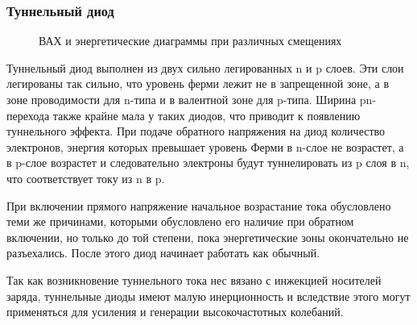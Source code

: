 \subsubsection{Туннельный диод}

\begin{center}
	\begin{figure}[h!]
		\caption{ВАХ и энергетические диаграммы при различных смещениях}	
		\label{pic:TunnelDiod}
	\end{figure}
\end{center}

Туннельный диод выполнен из двух сильно легированных n и p слоев. Эти слои легированы так сильно, что уровень ферми лежит не в запрещенной зоне, а в зоне проводимости для n-типа и в валентной зоне для p-типа.
Ширина pn-перехода также крайне мала у таких диодов, что приводит к появлению туннельного эффекта.
При подаче обратного напряжения на диод количество электронов, энергия которых превышает уровень Ферми в n-слое не возрастет, а в p-слое возрастет и следовательно электроны будут туннелировать из p  слоя в n, что соответствует току из n в p. 

При включении прямого напряжение начальное возрастание тока обусловлено теми же причинами, которыми обусловлено его наличие при обратном включении, но только до той степени, пока энергетические зоны окончательно не разъехались. После этого диод начинает работать как обычный.


 Так как возникновение туннельного тока нес вязано с инжекцией носителей заряда, туннельные диоды имеют малую инерционность и вследствие этого могут применяться для усиления и генерации высокочастотных колебаний.



